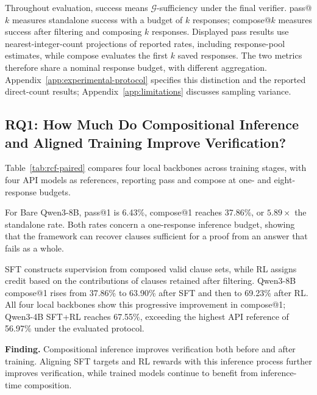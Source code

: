 Throughout evaluation, success means \(\mathcal G\)-sufficiency under the final
verifier.  pass@\(k\) measures standalone success with a budget of \(k\)
responses; compose@\(k\) measures success after filtering and composing
\(k\) responses.  Displayed pass results use nearest-integer-count projections of reported
rates, including response-pool estimates, while compose evaluates the first \(k\) saved responses.  The two metrics
therefore share a nominal response budget, with different aggregation.
Appendix~\ref{app:experimental-protocol} specifies this distinction and the
reported direct-count results; Appendix~\ref{app:limitations} discusses
sampling variance.


\subsection{RQ1: How Much Do Compositional Inference and Aligned Training Improve Verification?}
\label{sec:exp:main}

Table~\ref{tab:rcf-paired} compares four local backbones across training
stages, with four API models as references, reporting pass and compose
at one- and eight-response budgets.



For Bare Qwen3-8B, pass@1 is 6.43\%,
compose@1 reaches 37.86\%, or \(5.89\times\) the standalone rate.
Both rates concern a one-response inference budget, showing that the framework can recover
clauses sufficient for a proof from an answer that fails as a whole.

SFT constructs supervision from composed valid clause sets, while RL assigns
credit based on the contributions of clauses retained after filtering.
Qwen3-8B compose@1 rises from 37.86\% to 63.90\% after SFT and then to
69.23\% after RL.  All four local backbones show this progressive
improvement in compose@1; Qwen3-4B SFT+RL reaches 67.55\%, exceeding the
highest API reference of 56.97\% under the evaluated protocol.

\begin{insightbox}
\textbf{Finding.}
Compositional inference improves verification both before and after training.
Aligning SFT targets and RL rewards with this inference process further improves
verification, while trained models continue to benefit from inference-time
composition.
\end{insightbox}

